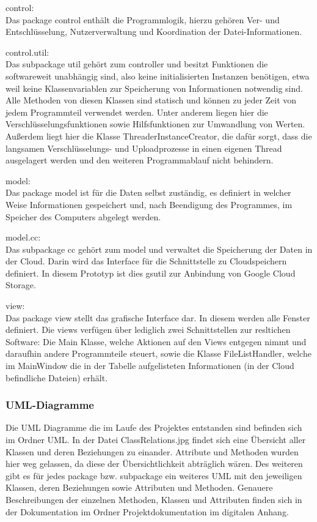 \documentclass[12pt,a4paper,bibliography=totocnumbered,listof=totocnumbered]{scrartcl}
\begin{document}
\begin{compactitem}
	\item control:\\
	Das package control enthält die Programmlogik, hierzu gehören Ver- und Entschlüsselung, Nutzerverwaltung und Koordination der Datei-Informationen.
	\item control.util:\\
	Das subpackage util gehört zum controller und besitzt Funktionen die softwareweit unabhängig sind, also keine initialisierten Instanzen benötigen, etwa weil keine Klassenvariablen zur Speicherung von Informationen notwendig sind. Alle Methoden von 	diesen Klassen sind statisch und können zu jeder Zeit von jedem Programmteil verwendet werden. Unter anderem liegen hier die Verschlüsselungsfunktionen sowie Hilfsfunktionen zur Umwandlung von Werten.  Außerdem liegt hier die Klasse 				ThreaderInstanceCreator, die dafür sorgt, dass die langsamen Verschlüsselungs- und Uploadprozesse in einen eigenen Thread ausgelagert werden und den weiteren Programmablauf nicht behindern.
	\item model:\\
	Das package model ist für die Daten selbst zuständig, es definiert in welcher Weise Informationen gespeichert und, nach Beendigung des Programmes, im Speicher des Computers abgelegt werden.
	\item model.cc:\\
	Das subpackage cc gehört zum model und verwaltet die Speicherung der Daten in der Cloud. Darin wird das Interface für die Schnittstelle zu Cloudspeichern definiert. In diesem Prototyp ist dies gsutil zur Anbindung von Google Cloud Storage.
	\item view:\\
	Das package view stellt das grafische Interface dar. In diesem werden alle Fenster definiert. Die views verfügen über lediglich zwei Schnittstellen zur resltichen Software: Die Main Klasse, welche Aktionen auf den Views entgegen nimmt und daraufhin 		andere Programmteile steuert, sowie die Klasse FileListHandler, welche im MainWindow die in der Tabelle aufgelisteten Informationen (in der Cloud befindliche Dateien) erhält.
\end{compactitem}
\subsubsection{UML-Diagramme}
Die UML Diagramme die im Laufe des Projektes entstanden sind befinden sich im Ordner UML. In der Datei ClassRelations.jpg findet sich eine Übersicht aller Klassen und deren Beziehungen zu einander. Attribute und Methoden wurden hier weg gelassen, da diese der Übersichtlichkeit abträglich wären. Des weiteren gibt es für jedes package bzw. subpackage ein weiteres UML mit den jeweiligen Klassen, deren Beziehungen sowie Attributen und Methoden. Genauere Beschreibungen der einzelnen Methoden, Klassen und Attributen finden sich in der Dokumentation im Ordner Projektdokumentation im digitalen Anhang.
\end{document}

